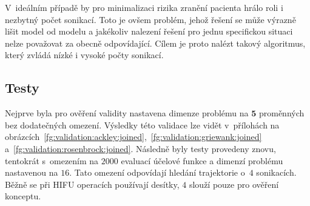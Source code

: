 V~ideálním případě by pro minimalizaci rizika zranění pacienta hrálo roli i nezbytný počet sonikací. Toto je ovšem problém, jehož řešení se může výrazně lišit model od modelu a jakékoliv nalezení řešení pro jednu specifickou situaci nelze považovat za obecně odpovídající. Cílem je proto nalézt takový algoritmus, který zvládá nízké i vysoké počty sonikací. 

\subsection{Testy}
Nejprve byla pro ověření validity nastavena dimenze problému na $\textbf{5}$ proměnných bez dodatečných omezení. Výsledky této validace lze vidět v~přílohách na obrázcích~\ref{fg:validation:ackley:joined},~\ref{fg:validation:griewank:joined} a~\ref{fg:validation:rosenbrock:joined}. Následně byly testy provedeny znovu, tentokrát s~omezením na $2000$ evaluací účelové funkce a dimenzí problému nastavenou na $16$. Tato omezení odpovídají hledání trajektorie o~$4$ sonikacích. Běžně se při HIFU operacích používají desítky, $4$ slouží pouze pro ověření konceptu.


\pagebreak
